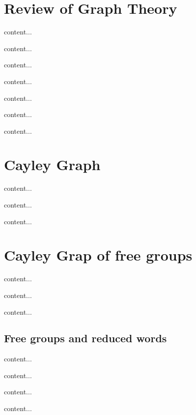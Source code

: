 \section{Review of Graph Theory}
\begin{definition}[Graph]
	content...
\end{definition}
\begin{definition}
	content...
\end{definition}
\begin{definition}
	content...
\end{definition}
\begin{definition}
	content...
\end{definition}
\begin{definition}
	content...
\end{definition}
\begin{proposition}
	content...
\end{proposition}
\begin{definition}
	content...
\end{definition}

\section{Cayley Graph}
\begin{definition}
	content...
\end{definition}
\begin{example}
	content...
\end{example}
\begin{remark}
	content...
\end{remark}

\section{Cayley Grap of free groups}
\begin{theorem}
	content...
\end{theorem}
\begin{example}
	content...
\end{example}
\begin{theorem}
	content...
\end{theorem}
\subsection{Free groups and reduced words}
\begin{definition}
	content...
\end{definition}
\begin{proposition}
	content...
\end{proposition}
\begin{conclusion}
	content...
\end{conclusion}
\begin{conclusion}
	content...
\end{conclusion}
